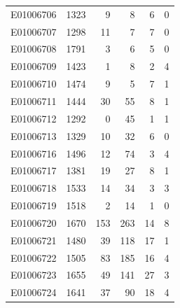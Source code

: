 \documentclass[
  letterpaper,
  DIV=11,
  numbers=noendperiod]{scrreprt}
\begin{document}
\begin{tabular}{lrrrrr}
E01006706     &    1323 &       9 &                     8 &                               6 &                       0 \\
E01006707     &    1298 &      11 &                     7 &                               7 &                       0 \\
E01006708     &    1791 &       3 &                     6 &                               5 &                       0 \\
E01006709     &    1423 &       1 &                     8 &                               2 &                       4 \\
E01006710     &    1474 &       9 &                     5 &                               7 &                       1 \\
E01006711     &    1444 &      30 &                    55 &                               8 &                       1 \\
E01006712     &    1292 &       0 &                    45 &                               1 &                       1 \\
E01006713     &    1329 &      10 &                    32 &                               6 &                       0 \\
E01006716     &    1496 &      12 &                    74 &                               3 &                       4 \\
E01006717     &    1381 &      19 &                    27 &                               8 &                       1 \\
E01006718     &    1533 &      14 &                    34 &                               3 &                       3 \\
E01006719     &    1518 &       2 &                    14 &                               1 &                       0 \\
E01006720     &    1670 &     153 &                   263 &                              14 &                       8 \\
E01006721     &    1480 &      39 &                   118 &                              17 &                       1 \\
E01006722     &    1505 &      83 &                   185 &                              16 &                       4 \\
E01006723     &    1655 &      49 &                   141 &                              27 &                       3 \\
E01006724     &    1641 &      37 &                    90 &                              18 &                       4 \\

\end{tabular}
\end{document}
